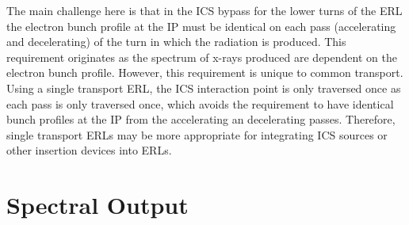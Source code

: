 \documentclass[../main.tex]{subfiles}
\begin{document}
The main challenge here is that in the ICS bypass for the lower turns of the ERL the electron bunch profile at the IP must be identical on each pass (accelerating and decelerating) of the turn in which the radiation is produced. This requirement originates as the spectrum of x-rays produced are dependent on the electron bunch profile. However, this requirement is unique to common transport. Using a single transport ERL, the ICS interaction point is only traversed once as each pass is only traversed once, which avoids the requirement to have identical bunch profiles at the IP from the accelerating an decelerating passes. Therefore, single transport ERLs may be more appropriate for integrating ICS sources or other insertion devices into ERLs. 

\section{Spectral Output}
\label{sec:CBETA_spectral_output}
\end{document}
